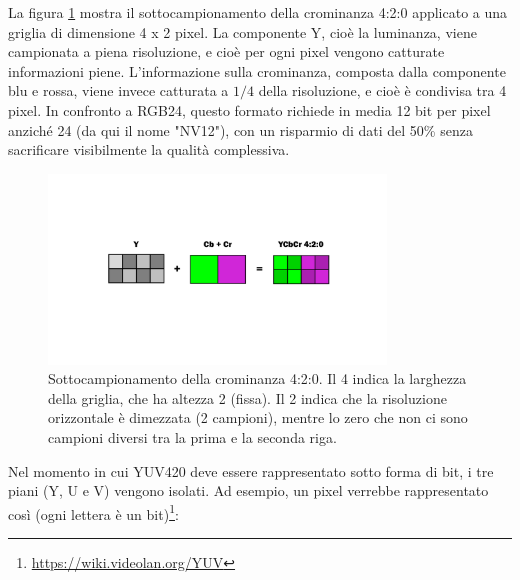 
La figura \ref{fig:diff_yuv420} mostra il sottocampionamento della crominanza 4:2:0 applicato a una griglia di dimensione 4 x 2 pixel. La componente Y, cioè la luminanza, viene campionata a piena risoluzione, e cioè per ogni pixel vengono catturate informazioni piene. L'informazione sulla crominanza, composta dalla componente blu e rossa\footnotemark{}, viene invece catturata a $1/4$ della risoluzione, e cioè è condivisa tra 4 pixel. In confronto a RGB24, questo formato richiede in media 12 bit per pixel anziché 24 (da qui il nome "NV12"), con un risparmio di dati del 50\% senza sacrificare visibilmente la qualità complessiva.


\begin{figure}[htbp]
	\centering
	
	\includegraphics[width=0.8\textwidth]{res/yuv420.pdf}
	
	\caption{Sottocampionamento della crominanza 4:2:0. Il 4 indica la larghezza della griglia, che ha altezza 2 (fissa). Il 2 indica che la risoluzione orizzontale è dimezzata (2 campioni), mentre lo zero che non ci sono campioni diversi tra la prima e la seconda riga.}
	\label{fig:diff_yuv420}
\end{figure}

Nel momento in cui YUV420 deve essere rappresentato sotto forma di bit, i tre piani (Y, U e V) vengono isolati. Ad esempio, un pixel verrebbe rappresentato così (ogni lettera è un bit)\footnote{\url{https://wiki.videolan.org/YUV}}:


